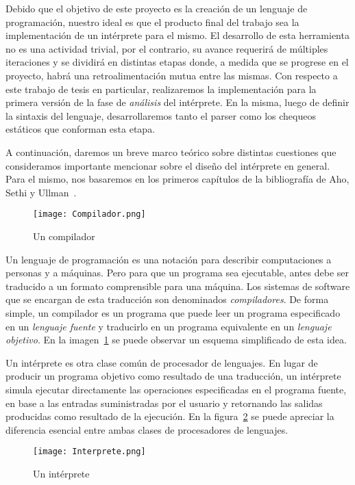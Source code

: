 Debido que el objetivo de este proyecto es la creación de un lenguaje de programación, nuestro ideal es que el producto final del trabajo sea la implementación de un intérprete para el mismo.
El desarrollo de esta herramienta no es una actividad trivial, por el contrario, su avance requerirá de múltiples iteraciones y se dividirá en distintas etapas donde, a medida que se progrese en el proyecto, habrá una retroalimentación mutua entre las mismas.
Con respecto a este trabajo de tesis en particular, realizaremos la implementación para la primera versión de la fase de \textit{análisis} del intérprete.
En la misma, luego de definir la sintaxis del lenguaje, desarrollaremos tanto el parser como los chequeos estáticos que conforman esta etapa.

A continuación, daremos un breve marco teórico sobre distintas cuestiones que consideramos importante mencionar sobre el diseño del intérprete en general.
Para el mismo, nos basaremos en los primeros capítulos de la bibliografía de Aho, Sethi y Ullman~\cite{Dragon}.

\begin{figure}[h]
\centering
\texttt{[image: Compilador.png]}
\caption{Un compilador}
\label{Compilador}
\end{figure}

Un lenguaje de programación es una notación para describir computaciones a personas y a máquinas.
Pero para que un programa sea ejecutable, antes debe ser traducido a un formato comprensible para una máquina.
Los sistemas de software que se encargan de esta traducción son denominados \textit{compiladores}.
De forma simple, un compilador es un programa que puede leer un programa especificado en un \textit{lenguaje fuente} y traducirlo en un programa equivalente en un \textit{lenguaje objetivo}.
En la imagen~\ref{Compilador} se puede observar un esquema simplificado de esta idea.

Un intérprete es otra clase común de procesador de lenguajes.
En lugar de producir un programa objetivo como resultado de una traducción, un intérprete simula ejecutar directamente las operaciones especificadas en el programa fuente, en base a las entradas suministradas por el usuario y retornando las salidas producidas como resultado de la ejecución.
En la figura~\ref{Intérprete} se puede apreciar la diferencia esencial entre ambas clases de procesadores de lenguajes.

\begin{figure}[h]
\centering
\texttt{[image: Interprete.png]}
\caption{Un intérprete}
\label{Intérprete}
\end{figure}

